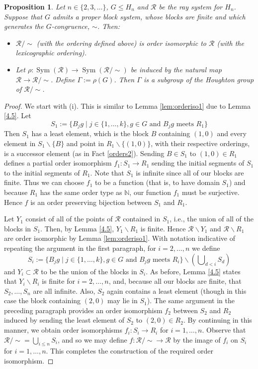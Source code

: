 \documentclass[11pt,a4paper]{amsart}
\renewcommand{\setminus}{\smallsetminus}
\newtheorem{proposition}[theorem]{Proposition}
\theoremstyle{definition}
\theoremstyle{remark}
\newcommand{\Sym}{\operatorname{Sym}}
\newcommand{\N}{\mathbb N}
\newcommand{\Ra}{\mathcal{R}}
\begin{document}
\begin{proposition}
	\label{ordering blocks}
	Let $n\in \{2, 3, \ldots\}$, $G\le H_n$ and $\Ra$ be the ray system for $H_n$. Suppose that $G$ admits a proper block system, whose blocks are finite and which generates the $G$-congruence, $\sim$. Then:
	\begin{itemize}
		\item[(i)] $\Ra/\sim$ (with the ordering defined above) is order isomorphic to $\Ra$ (with the lexicographic ordering).
		\item[(ii)] Let $\rho: \Sym(\Ra)\to \Sym(\Ra/\sim)$ be induced by the natural map $\Ra \to \Ra/\sim$. Define $\Gamma:=\rho(G)$. Then $\Gamma$ is a subgroup of the Houghton group of $\Ra/\sim$.
	\end{itemize}
\end{proposition}
\begin{proof}
We start with (i). This is similar to Lemma \ref{lem:orderiso1} due to Lemma \ref{4.5}. Let 
$$S_1:=\{B_jg \mid j\in \{1, \ldots, k\}, g\in G\textrm{ and }B_jg\textrm{ meets }R_1\}$$
Then $S_1$ has a least element, which is the block $B$ containing $(1,0)$ and every element in $S_1\setminus\{B\}$ and point in $R_1\setminus\{(1, 0)\}$, with their respective orderings, is a successor element (as in Fact \ref{orders2}). Sending $B\in S_1$ to $(1, 0)\in R_1$ defines a partial order isomorphism $f_1: S_1 \to R_1$ sending the initial segments of $S_1$ to the initial segments of $R_1$. Note that $S_1$ is infinite since all of our blocks are finite. Thus we can choose $f_1$ to be a function (that is, to have domain $S_1$) and because $R_1$ has the same order type as $\N$, our function $f_1$ must be surjective. Hence $f$ is an order preserving bijection between $S_1$ and $R_1$.

Let $Y_1$ consist of all of the points of $\Ra$ contained in $S_1$, i.e., the union of all of the blocks in $S_1$. Then, by Lemma \ref{4.5}, $Y_1\setminus R_1$ is finite. Hence $\Ra\setminus Y_1$ and $\Ra\setminus R_1$ are order isomorphic by Lemma \ref{lem:orderiso1}. With notation indicative of repeating the argument in the first paragraph, for $i=2, \ldots, n$ we define 
$$S_i:=\{B_jg \mid j\in \{1, \ldots, k\}, g\in G\textrm{ and }B_jg\textrm{ meets }R_i\}\setminus (\bigcup\nolimits_{d<i} S_d)$$ and $Y_i\subset \Ra$ to be the union of the blocks in $S_i$. As before, Lemma \ref{4.5} states that $Y_i\setminus R_i$ is finite for $i=2, \ldots, n$, and, because all our blocks are finite, that $S_2, \ldots, S_n$ are all infinite. Also, $S_2$ again contains a least element (though in this case the block containing $(2,0)$ may lie in $S_1$). The same argument in the preceding paragraph provides an order isomorphism $f_2$ between $S_2$ and $R_2$ induced by sending the least element of $S_2$ to $(2, 0)\in R_2$. By continuing in this manner, we obtain order isomorphisms $f_i: S_i\to R_i$ for $i=1, \ldots, n$. Observe that $\Ra/\sim=\bigcup_{i\le n}S_i$, and so we may define $f: \Ra/\sim\to \Ra$ by the image of $f_i$ on $S_i$ for $i=1, \ldots, n$. This completes the construction of the required order isomorphism.


\end{proof}
\end{document}
